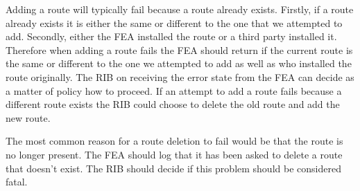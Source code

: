 \documentclass[11pt]{article}
\begin{document}
Adding a route will typically fail because a route already exists.
Firstly, if a route already exists it is either the same or different
to the one that we attempted to add. Secondly, either the FEA
installed the route or a third party installed it. Therefore when
adding a route fails the FEA should return if the current route is the
same or different to the one we attempted to add as well as who
installed the route originally. The RIB on receiving the error state
from the FEA can decide as a matter of policy how to proceed. If an
attempt to add a route fails because a different route exists the RIB
could choose to delete the old route and add the new route.

The most common reason for a route deletion to fail would be that the
route is no longer present. The FEA should log that it has been asked
to delete a route that doesn't exist. The RIB should decide if this
problem should be considered fatal.





\end{document}
